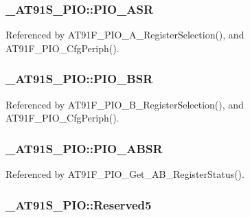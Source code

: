 \hypertarget{struct__AT91S__PIO_533565afac018362cb6d559881ff0f13}{
\subsubsection{ {\bf \_\-AT91S\_\-PIO::PIO\_\-ASR}}}
\label{struct__AT91S__PIO_533565afac018362cb6d559881ff0f13}




Referenced by AT91F\_\-PIO\_\-A\_\-RegisterSelection(), and AT91F\_\-PIO\_\-CfgPeriph().\hypertarget{struct__AT91S__PIO_64dfd9798a49e4d95a3f032bd285579f}{
\subsubsection{ {\bf \_\-AT91S\_\-PIO::PIO\_\-BSR}}}
\label{struct__AT91S__PIO_64dfd9798a49e4d95a3f032bd285579f}




Referenced by AT91F\_\-PIO\_\-B\_\-RegisterSelection(), and AT91F\_\-PIO\_\-CfgPeriph().\hypertarget{struct__AT91S__PIO_f640c29856ea42d101514823cb819efa}{
\subsubsection{ {\bf \_\-AT91S\_\-PIO::PIO\_\-ABSR}}}
\label{struct__AT91S__PIO_f640c29856ea42d101514823cb819efa}




Referenced by AT91F\_\-PIO\_\-Get\_\-AB\_\-RegisterStatus().\hypertarget{struct__AT91S__PIO_c88b41ba83ed5fb1c7f281c88348c604}{
\subsubsection{ {\bf \_\-AT91S\_\-PIO::Reserved5}}}
\label{struct__AT91S__PIO_c88b41ba83ed5fb1c7f281c88348c604}


